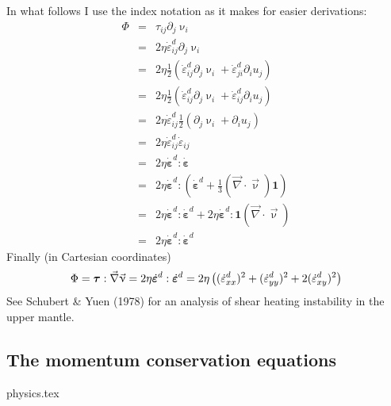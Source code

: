 In what follows I use the index notation as it makes for easier derivations:
\begin{eqnarray}
\Phi 
&=& \tau_{ij}\partial_j \upnu_i \nonumber\\
&=& 2 \eta \dot{\varepsilon}_{ij}^d\partial_j \upnu_i \nonumber\\
&=& 2 \eta \frac{1}{2}\left( \dot{\varepsilon}_{ij}^d\partial_j \upnu_i + \dot{\varepsilon}_{ji}^d\partial_i u_j \right) \nonumber\\
&=& 2 \eta \frac{1}{2}\left( \dot{\varepsilon}_{ij}^d\partial_j \upnu_i + \dot{\varepsilon}_{ij}^d\partial_i u_j \right) \nonumber\\
&=& 2 \eta  \dot{\varepsilon}_{ij}^d  \frac{1}{2}\left(\partial_j \upnu_i + \partial_i u_j \right) \nonumber\\
&=& 2 \eta  \dot{\varepsilon}_{ij}^d   \dot{\varepsilon}_{ij} \nonumber\\
&=& 2 \eta  \dot{\bm \varepsilon}^d :  \dot{\bm \varepsilon} \nonumber\\
&=& 2 \eta  \dot{\bm \varepsilon}^d : \left( \dot{\bm \varepsilon}^d +\frac{1}{3} ({\vec \nabla}\cdot{\vec \upnu}) {\bm 1} \right)\nonumber\\
&=& 2 \eta  \dot{\bm \varepsilon}^d : \dot{\bm \varepsilon}^d 
+ 2 \eta  \dot{\bm \varepsilon}^d : {\bm 1} ({\vec \nabla}\cdot{\vec \upnu}) \nonumber\\ 
&=& 2 \eta  \dot{\bm \varepsilon}^d : \dot{\bm \varepsilon}^d 
\end{eqnarray}
Finally (in Cartesian coordinates)
\begin{equation}
\Phi = {\bm \tau}:{\vec \nabla}{\vec \upnu} = 2 \eta  \dot{\bm \varepsilon}^d : \dot{\bm \varepsilon}^d
= 2 \eta \left( (\dot{\varepsilon}_{xx}^d)^2 + (\dot{\varepsilon}_{yy}^d)^2 + 2(\dot{\varepsilon}_{xy}^d)^2 \right) \nonumber
\end{equation}
See Schubert \& Yuen (1978) \cite{scyu78} for an analysis of shear heating instability in the upper mantle.

\subsection{The momentum conservation equations} 
\begin{flushright} {\tiny {\color{gray} physics.tex}} \end{flushright}

